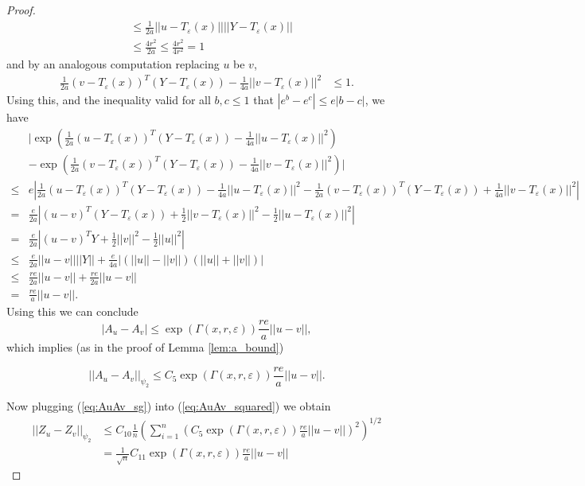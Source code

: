 \documentclass{article}
\theoremstyle{definition}
\newcommand{\Teps}{T_\varepsilon}
\begin{document}
\begin{proof}
\begin{align*}
        &\leq \frac{1}{2a} ||u-\Teps(x)||||Y - \Teps(x)|| \\
        &\leq \frac{4r^2}{2a} \leq \frac{4r^2}{4r^2} = 1 
    \end{align*} 
    and by an analogous computation replacing $u$ be $v$,
    \begin{align*}
        \frac{1}{2a}\left ( v - \Teps(x) \right )^T(Y - \Teps(x)) - \frac{1}{4a}||v - \Teps(x)||^2 &\leq 1.
    \end{align*}
    Using this, and the inequality valid for all $b,c \leq 1$ that $|e^b - e^c| \leq e|b-c|$, we have
    \begin{align*}
        &\bigg | \exp \left (
                \frac{1}{2a}\left ( u - \Teps(x) \right )^T(Y - \Teps(x)) - \frac{1}{4a}||u - \Teps(x)||^2 
            \right ) \\
            & - \exp \left (
                \frac{1}{2a}\left ( v - \Teps(x) \right )^T(Y - \Teps(x)) - \frac{1}{4a}||v - \Teps(x)||^2 \right ) \bigg | \\
        \leq& e \left |\frac{1}{2a}\left ( u - \Teps(x) \right )^T(Y - \Teps(x)) - \frac{1}{4a}||u - \Teps(x)||^2 - \frac{1}{2a}\left ( v - \Teps(x) \right )^T(Y - \Teps(x)) + \frac{1}{4a}||v - \Teps(x)||^2 \right | \\
        =& \frac{e}{2a}\left | (u-v)^T(Y - \Teps(x)) + \frac{1}{2}||v-\Teps(x)||^2 - \frac{1}{2}||u-\Teps(x)||^2 \right | \\
        =& \frac{e}{2a} \left |(u-v)^TY  + \frac{1}{2}||v||^2 - \frac{1}{2}||u||^2 \right | \\
        \leq& \frac{e}{2a}||u-v||||Y|| + \frac{e}{4a}\left | (||u|| - ||v||) (||u|| + ||v||)\right | \\
        \leq& \frac{re}{2a}||u-v|| + \frac{re}{2a} ||u-v|| \\
        =&\frac{re}{a}||u-v||.
    \end{align*}
    Using this we can conclude
    \begin{equation*}
        |A_u - A_v| \leq  \exp\left( \Gamma(x,r, \varepsilon)\right)  \frac{re}{a}||u-v||,
    \end{equation*}
    which implies (as in the proof of Lemma \ref{lem:a_bound})
    
    \begin{equation} \label{eq:AuAv_sg}
        ||A_u - A_v||_{\psi_2} \leq C_5 \exp\left( \Gamma(x,r, \varepsilon)\right)  \frac{re}{a}||u-v||.
    \end{equation}

    Now plugging (\ref{eq:AuAv_sg}) into (\ref{eq:AuAv_squared}) we obtain
    \begin{align*}
        ||Z_u - Z_v||_{\psi_2} &\leq C_{10} \frac{1}{n} \left( \sum_{i=1}^n \left(C_5 \exp\left(\Gamma(x,r, \varepsilon)\right)\frac{re}{a}||u-v|| \right )^2 \right )^{1/2} \\
        &= \frac{1}{\sqrt{n}} C_{11} \exp\left( \Gamma(x,r, \varepsilon)\right)\frac{re}{a}||u-v||
    \end{align*}


\end{proof}
\end{document}
